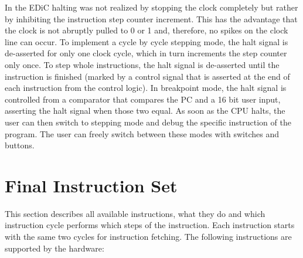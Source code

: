 In the \gls{EDiC} halting was not realized by stopping the clock completely but rather by inhibiting the instruction step counter increment.
This has the advantage that the clock is not abruptly pulled to 0 or 1 and, therefore, no spikes on the clock line can occur.
To implement a cycle by cycle stepping mode, the halt signal is de-asserted for only one clock cycle, which in turn increments the step counter only once.
To step whole instructions, the halt signal is de-asserted until the instruction is finished (marked by a control signal that is asserted at the end of each instruction from the control logic).
In breakpoint mode, the halt signal is controlled from a comparator that compares the \gls{PC} and a 16 bit user input, asserting the halt signal when those two equal.
As soon as the \gls{CPU} halts, the user can then switch to stepping mode and debug the specific instruction of the program.
The user can freely switch between these modes with switches and buttons.

\section{Final Instruction Set}\label{sec:instructionSet}
This section describes all available instructions, what they do and which instruction cycle performs which steps of the instruction.
Each instruction starts with the same two cycles for instruction fetching.
The following instructions are supported by the hardware:
